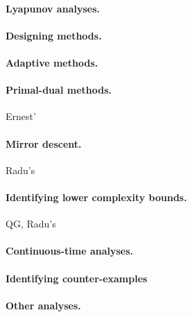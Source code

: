 \documentclass[11pt,a4paper]{article}
\begin{document}
	\paragraph{Lyapunov analyses.}
	\paragraph{Designing methods.}
	\paragraph{Adaptive methods.}
	\paragraph{Primal-dual methods.} Ernest'
	\paragraph{Mirror descent.} Radu's
	\paragraph{Identifying lower complexity bounds.} QG, Radu's
	\paragraph{Continuous-time analyses.}
	\paragraph{Identifying counter-examples}
	\paragraph{Other analyses.}
	
	

{}
\end{document}
